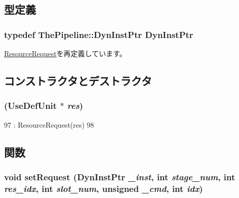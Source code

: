 \subsection{型定義}
\hypertarget{classUseDefUnit_1_1UseDefRequest_af9d0c8a46736ba6aa2d8bb94da1a5e73}{
\subsubsection[{DynInstPtr}]{\setlength{\rightskip}{0pt plus 5cm}typedef {\bf ThePipeline::DynInstPtr} {\bf DynInstPtr}}}
\label{classUseDefUnit_1_1UseDefRequest_af9d0c8a46736ba6aa2d8bb94da1a5e73}


\hyperlink{classResourceRequest_af9d0c8a46736ba6aa2d8bb94da1a5e73}{ResourceRequest}を再定義しています。

\subsection{コンストラクタとデストラクタ}
\hypertarget{classUseDefUnit_1_1UseDefRequest_a7d151741b3f8f4f6dc722cbb62f6b170}{
\subsubsection[{UseDefRequest}]{ ({\bf UseDefUnit} $\ast$ {\em res})}}
\label{classUseDefUnit_1_1UseDefRequest_a7d151741b3f8f4f6dc722cbb62f6b170}



\begin{DoxyCode}
97             : ResourceRequest(res)
98         { }
\end{DoxyCode}


\subsection{関数}
\hypertarget{classUseDefUnit_1_1UseDefRequest_ad26d470fa8b93d0d167abad9c5ca8e34}{
\subsubsection[{setRequest}]{\setlength{\rightskip}{0pt plus 5cm}void setRequest ({\bf DynInstPtr} {\em \_\-inst}, \/  int {\em stage\_\-num}, \/  int {\em res\_\-idx}, \/  int {\em slot\_\-num}, \/  unsigned {\em \_\-cmd}, \/  int {\em idx})}}
\label{classUseDefUnit_1_1UseDefRequest_ad26d470fa8b93d0d167abad9c5ca8e34}



